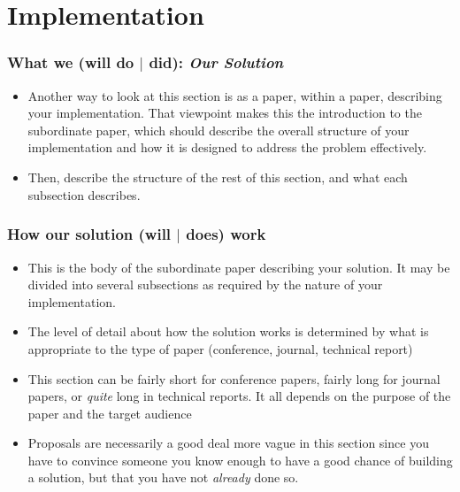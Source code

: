 \documentclass[11pt]{article}
\begin{document}
\section{Implementation}
\label{sec:Implementation}

\subsubsection*{What we (will do $|$ did): {\em Our Solution}}
\begin{itemize}
\item   Another way to look at this section is as a paper, within a paper,
describing your implementation. That viewpoint makes this the introduction to
the subordinate paper, which should describe the overall structure of your
implementation and how it is designed to address the problem effectively.

\item   Then, describe the structure of the rest of this section, and what each
subsection describes.

\end{itemize}


\subsubsection*{How our solution (will $|$ does) work}
\begin{itemize}
\item   This is the body of the subordinate paper describing your solution. It
may be divided into several subsections as required by the nature of your
implementation.

\item   The level of detail about how the solution works is determined by what
is appropriate to the type of paper (conference, journal, technical report)

\item   This section can be fairly short for conference papers, fairly long for
journal papers, or {\em quite} long in technical reports. It all depends on the
purpose of the paper and the target audience

\item   Proposals are necessarily a good deal more vague in this section since
you have to convince someone you know enough to have a good chance of building
a solution, but that you have not {\em already} done so.

\end{itemize}
\end{document}
